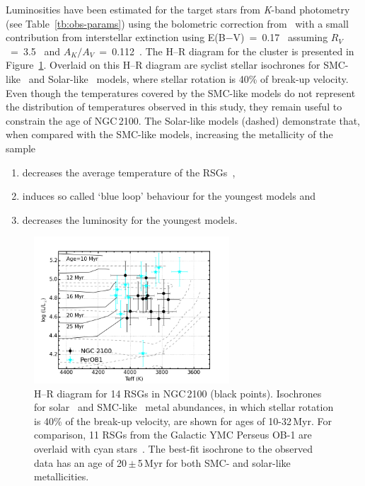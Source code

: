 Luminosities have been estimated for the target stars from {\it K}-band photometry (see Table~\ref{tb:obs-params}) using the bolometric correction from~\cite{2013ApJ...767....3D} with a small contribution from interstellar extinction using E(B$-$V)~=~0.17~\citep{2015A&A...575A..62N} assuming $R_V$~=~3.5~\citep{2013A&A...558A.134D} and $A_K/A_V$~=~0.112~\citep{1985ApJ...288..618R}.
The H--R diagram for the cluster is presented in Figure~\ref{fig:HRD}.
Overlaid on this H--R diagram are {\sc syclist} stellar isochrones for SMC-like~\citep[solid lines;][]{2013A&A...558A.103G} and Solar-like~\citep[dashed lines;][]{2012A&A...537A.146E} models, where stellar rotation is 40\% of break-up velocity.
Even though the temperatures covered by the SMC-like models do not represent the distribution of temperatures observed in this study, they remain useful to constrain the age of NGC\,2100.
The Solar-like models (dashed) demonstrate that, when compared with the SMC-like models, increasing the metallicity of the sample
\begin{enumerate}
\item decreases the average temperature of the RSGs~\citep[something which is not observed by][see Chapter~\ref{ch:ngc6822}]{2015ApJ...803...14P},
\item induces so called `blue loop' behaviour for the youngest models and
\item decreases the luminosity for the youngest models.
\end{enumerate}

\begin{figure}
\centering
 \includegraphics[width=0.65\textwidth]{ngc2100/NGC2100-HRD-perOB1}
 \caption[NGC\,2100 H--R diagram for RSGs]{H--R diagram for 14 RSGs in NGC\,2100 (black points).
  Isochrones for solar~\citep[dashed grey lines;][]{2012A&A...537A.146E} and SMC-like~\citep[solid black lines;][]{2013A&A...558A.103G} metal abundances,
  in which stellar rotation is 40\% of the break-up velocity, are shown for ages of 10-32\,Myr. For comparison, 11 RSGs from the Galactic YMC Perseus OB-1 are overlaid with cyan stars~\citep{2014ApJ...788...58G}.
  The best-fit isochrone to the observed data has an age of 20\,$\pm$\,5\,Myr for both SMC- and solar-like metallicities.
  \label{fig:HRD}
          }
\end{figure}


